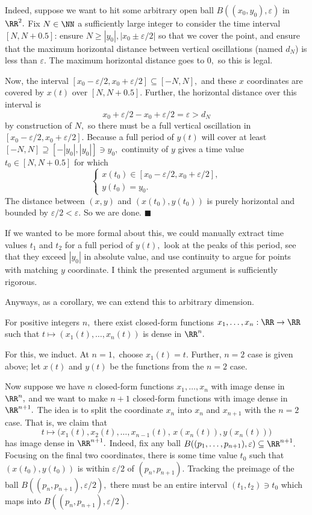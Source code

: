 Indeed, suppose we want to hit some arbitrary open ball $B((x_0,y_0),\varepsilon)$ in $\RR^2.$ Fix $N\in\NN$ a sufficiently large integer to consider the time interval $[N,N+0.5]$: ensure $N\ge|y_0|,|x_0\pm\varepsilon/2|$ so that we cover the point, and ensure that the maximum horizontal distance between vertical oscillations (named $d_N$) is less than $\varepsilon.$ The maximum horizontal distance goes to $0,$ so this is legal.

Now, the interval $[x_0-\varepsilon/2,x_0+\varepsilon/2]\subseteq[-N,N],$ and these $x$ coordinates are covered by $x(t)$ over $[N,N+0.5].$ Further, the horizontal distance over this interval is
\[x_0+\varepsilon/2-x_0+\varepsilon/2=\varepsilon>d_N\]
by construction of $N,$ so there must be a full vertical oscillation in $[x_0-\varepsilon/2,x_0+\varepsilon/2].$ Because a full period of $y(t)$ will cover at least $[-N,N]\supseteq[-|y_0|,|y_0|]\ni y_0,$ continuity of $y$ gives a time value $t_0\in[N,N+0.5]$ for which
\[\begin{cases}
    x(t_0)\in[x_0-\varepsilon/2,x_0+\varepsilon/2], \\
    y(t_0)=y_0.
\end{cases}\]
The distance between $(x,y)$ and $(x(t_0),y(t_0))$ is purely horizontal and bounded by $\varepsilon/2<\varepsilon.$ So we are done. $\blacksquare$

If we wanted to be more formal about this, we could manually extract time values $t_1$ and $t_2$ for a full period of $y(t),$ look at the peaks of this period, see that they exceed $|y_0|$ in absolute value, and use continuity to argue for points with matching $y$ coordinate. I think the presented argument is sufficiently rigorous.

Anyways, as a corollary, we can extend this to arbitrary dimension.
\begin{proposition}
    For positive integers $n,$ there exist closed-form functions $x_1,\ldots,x_n:\RR\to\RR$ such that $t\mapsto(x_1(t),\ldots,x_n(t))$ is dense in $\RR^n.$
\end{proposition}
For this, we induct. At $n=1,$ choose $x_1(t)=t.$ Further, $n=2$ case is given above; let $x(t)$ and $y(t)$ be the functions from the $n=2$ case.

Now suppose we have $n$ closed-form functions $x_1,\ldots,x_n$ with image dense in $\RR^n,$ and we want to make $n+1$ closed-form functions with image dense in $\RR^{n+1}.$ The idea is to split the coordinate $x_n$ into $x_n$ and $x_{n+1}$ with the $n=2$ case. That is, we claim that
\[t\longmapsto\big(x_1(t),x_2(t),\ldots,x_{n-1}(t),\,x(x_n(t)),y(x_n(t))\big)\]
has image dense in $\RR^{n+1}.$ Indeed, fix any ball $B((p_1,\ldots,p_{n+1}),\varepsilon)\subseteq\RR^{n+1}.$ Focusing on the final two coordinates, there is some time value $t_0$ such that $(x(t_0),y(t_0))$ is within $\varepsilon/2$ of $(p_n,p_{n+1}).$ Tracking the preimage of the ball $B((p_n,p_{n+1}),\varepsilon/2),$ there must be an entire interval $(t_1,t_2)\ni t_0$ which maps into $B((p_n,p_{n+1}),\varepsilon/2).$

